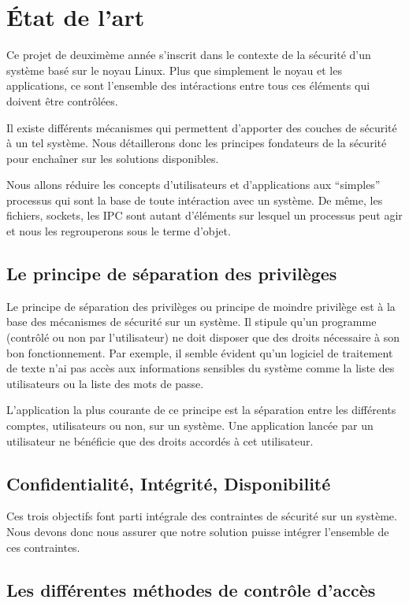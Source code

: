 \section{\'Etat de l'art}

Ce projet de deuximème année s'inscrit dans le contexte de la sécurité d'un système basé sur le noyau Linux. Plus que simplement le noyau et les applications, ce sont l'ensemble des intéractions entre tous ces éléments qui doivent être contrôlées.

Il existe différents mécanismes qui permettent d'apporter des couches de sécurité à un tel système. Nous détaillerons donc les principes fondateurs de la sécurité pour enchaîner sur les solutions disponibles.

Nous allons réduire les concepts d'utilisateurs et d'applications aux ``simples'' processus qui sont la base de toute intéraction avec un système. De même, les fichiers, sockets, les IPC sont autant d'éléments sur lesquel un processus peut agir et nous les regrouperons sous le terme d'objet.

\subsection{Le principe de séparation des privilèges}

Le principe de séparation des privilèges ou principe de moindre privilège est à la base des mécanismes de sécurité sur un système. Il stipule qu'un programme (contrôlé ou non par l'utilisateur) ne doit disposer que des droits nécessaire à son bon fonctionnement. Par exemple, il semble évident qu'un logiciel de traitement de texte n'ai pas accès aux informations sensibles du système comme la liste des utilisateurs ou la liste des mots de passe.

L'application la plus courante de ce principe est la séparation entre les différents comptes, utilisateurs ou non, sur un système. Une application lancée par un utilisateur ne bénéficie que des droits accordés à cet utilisateur.

\subsection{Confidentialité, Intégrité, Disponibilité}

Ces trois objectifs font parti intégrale des contraintes de sécurité sur un système. Nous devons donc nous assurer que notre solution puisse intégrer l'ensemble de ces contraintes.

\subsection{Les différentes méthodes de contrôle d'accès}

